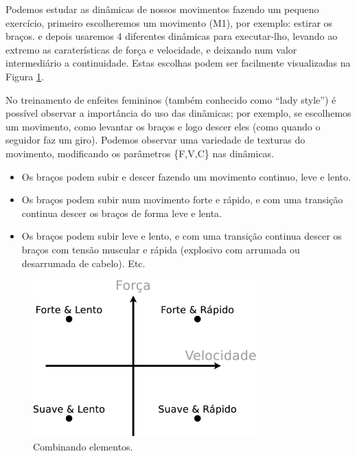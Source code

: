 \begin{example}
Podemos estudar as dinâmicas de nossos movimentos fazendo um pequeno exercício,
primeiro escolheremos um movimento (M1), por exemplo: estirar os braços.
e depois usaremos 4 diferentes dinâmicas para executar-lho,
levando ao extremo as caraterísticas de força e velocidade,
e deixando num valor intermediário a continuidade.
Estas escolhas podem ser facilmente visualizadas na Figura \ref{fig:element:moviment2}.
\end{example}



\begin{example}
No treinamento de enfeites femininos (também conhecido como ``lady style'')
é possível observar a importância do uso das dinâmicas;
por exemplo, se escolhemos um movimento, 
como levantar os braços e logo descer eles (como quando o seguidor faz um giro).
Podemos observar uma variedade de texturas do movimento,
modificando os parâmetros  \{F,V,C\} nas dinâmicas.
\begin{itemize}
\item Os braços podem subir e descer fazendo um movimento continuo, leve e lento.
\item Os braços podem subir num movimento forte e rápido,
e com uma transição continua descer os braços de forma leve e lenta.
\item Os braços podem subir leve e lento,
e com uma transição continua descer os braços com tensão muscular e rápida 
(explosivo com arrumada ou desarrumada de cabelo). Etc.
\end{itemize}
\end{example}

\begin{figure}[!h]
  \centering
    \includegraphics[width=0.77\textwidth]{chapters/cap-musicalidade/dinamicas-elementos2.eps}
\caption{Combinando elementos.}
\label{fig:element:moviment2}
\end{figure}

